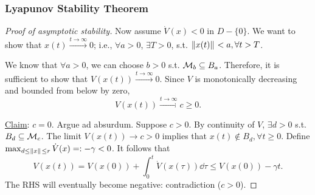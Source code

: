 \begin{frame}
    \frametitle{Lyapunov Stability Theorem}

    \begin{proof}[Proof of asymptotic stability]
        Now assume $\dot{V}(x) < 0$ in $D - \{0\}$. We want to show that $x(t)
        \xrightarrow{t \to \infty} 0$; i.e., $\forall a > 0$, $\exists T > 0$, 
        s.t. $\|{x(t)}\|_{{}_{}} < a, \forall t > T$.

        We know that $\forall a > 0$, we can choose $b > 0$ s.t. $\mathcal{M}_b
        \subseteq B_a$. Therefore, it is sufficient to show that $V(x(t))
        \xrightarrow{t \to \infty} 0$. Since $V$ is monotonically decreasing and
        bounded from below by zero, \[ V(x(t)) \xrightarrow{t \to \infty} c \geq
        0. \]

        \underline{Claim}: $c = 0$. Argue ad absurdum. Suppose $c > 0$. By
        continuity of $V$, $\exists d > 0$ s.t. $B_d \subseteq \mathcal{M}_c$. The
        limit $V(x(t)) \rightarrow c > 0$ implies that $x(t) \notin B_d, \forall
        t \geq 0$. Define $\max_{d \leq \|{x}\|_{{}_{}} \leq r} \dot{V}(x) =: -\gamma
        < 0$. It follows that 
        \[
        V(x(t)) = V(x(0)) + \int_0^t \dot{V}(x(\tau)) \dd \tau \leq V(x(0)) - \gamma t.
        \]
        The RHS will eventually become negative: contradiction ($c > 0$).
    \end{proof}
\end{frame}


